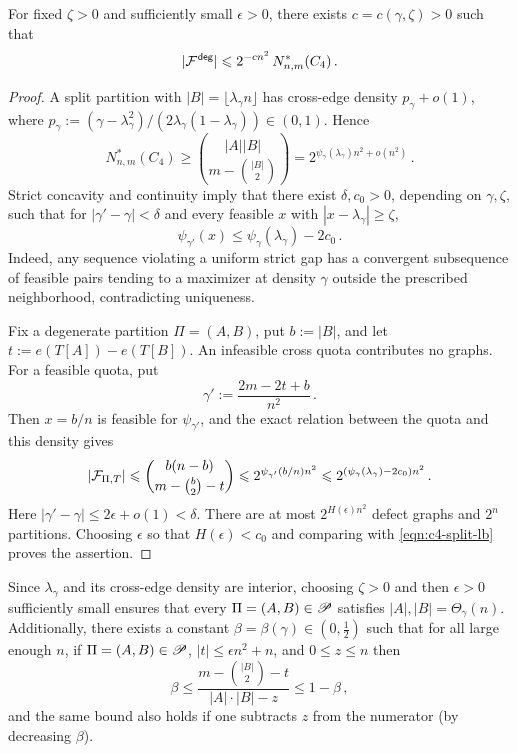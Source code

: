 \begin{lemma}\label{lemma:almost-all-nondeg}
For fixed $\zeta>0$ and sufficiently small $\epsilon>0$, there exists $c=c(\gamma,\zeta)>0$ such that
$$|{\mathcal F}^{\hspace{0.2mm}\mathsf{deg}}|\leqslant 2^{-cn^2}\,N^\ast_{n,m}(C_4)\,.$$
\end{lemma}
\begin{proof}
A split partition with $|B|=\lfloor\lambda_\gamma n\rfloor$ has cross-edge density $p_\gamma+o(1)$, where $p_\gamma:=(\gamma-\lambda_\gamma^2)/(2\lambda_\gamma(1-\lambda_\gamma))\in(0,1)$. Hence
\begin{equation}\label{eqn:c4-split-lb}
N^\ast_{n,m}(C_4)\geq\binom{|A||B|}{m-\binom{|B|}{2}}=2^{\psi_\gamma(\lambda_\gamma)n^2+o(n^2)}\,.
\end{equation}
Strict concavity and continuity imply that there exist $\delta,c_0>0$, depending on $\gamma,\zeta$, such that for $|\gamma'-\gamma|<\delta$ and every feasible $x$ with $|x-\lambda_\gamma|\geq\zeta$,
$$\psi_{\gamma'}(x)\leq\psi_\gamma(\lambda_\gamma)-2c_0\,.$$
Indeed, any sequence violating a uniform strict gap has a convergent subsequence of feasible pairs tending to a maximizer at density $\gamma$ outside the prescribed neighborhood, contradicting uniqueness.

Fix a degenerate partition $\Pi=(A,B)$, put $b:=|B|$, and let $t:=e(T[A])-e(T[B])$. An infeasible cross quota contributes no graphs. For a feasible quota, put
$$\gamma':=\frac{2m-2t+b}{n^2}\,.$$
Then $x=b/n$ is feasible for $\psi_{\gamma'}$, and the exact relation between the quota and this density gives
$$|{\mathcal F}_{\Pi,T}|\leqslant\binom{b(n-b)}{m-\binom{b}{2}-t}\leqslant2^{\psi_{\gamma'}(b/n)n^2}\leqslant2^{(\psi_\gamma(\lambda_\gamma)-2c_0)n^2}\,.$$
Here $|\gamma'-\gamma|\leq2\epsilon+o(1)<\delta$. There are at most $2^{H(\epsilon)n^2}$ defect graphs and $2^n$ partitions. Choosing $\epsilon$ so that $H(\epsilon)<c_0$ and comparing with \eqref{eqn:c4-split-lb} proves the assertion.
\end{proof}

\begin{remark}\label{rem:c4-nondeg-bounds}
Since $\lambda_\gamma$ and its cross-edge density are interior, choosing $\zeta>0$ and then $\epsilon>0$ sufficiently small ensures that every $\Pi=(A,B)\in{\mathscr P}$ satisfies $|A|,|B|=\Theta_\gamma(n)$. Additionally, there exists a constant $\beta=\beta(\gamma)\in(0,\frac12)$ such that for all large enough $n$, if $\Pi=(A,B)\in{\mathscr P}$, $|t|\leq \epsilon n^2+n$, and $0\leq z\leq n$ then
\begin{equation}\label{eqn:c4-p-bounded}
\beta\leq \frac{m-\binom{|B|}{2}-t}{|A|\cdot|B|-z}\leq1-\beta\,,
\end{equation}
and the same bound also holds if one subtracts $z$ from the numerator (by decreasing $\beta$).
\end{remark}

